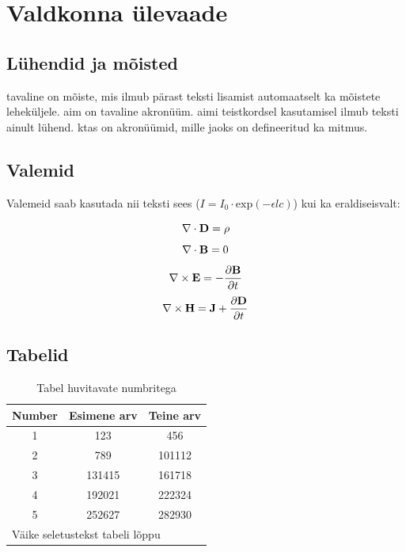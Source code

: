 %
%
%

\section{Valdkonna ülevaade}

\subsection{Lühendid ja mõisted}

\Gls{tavaline} on mõiste, mis ilmub pärast teksti lisamist automaatselt ka mõistete leheküljele.
\Gls{aim} on tavaline akronüüm.
\Gls{aim}i teistkordsel kasutamisel ilmub teksti ainult lühend.
\Glspl{kta} on akronüümid, mille jaoks on defineeritud ka mitmus.

\subsection{Valemid}

Valemeid saab kasutada nii teksti sees ($ I = I_0 \cdot \textrm{exp}(-\epsilon l c)$) kui ka eraldiseisvalt:

\begin{equation}
    \label{gauss}
    \nabla\cdot{\bf D} = \rho
\end{equation}
\begin{equation}
    \label{gaussmagnet}
    \nabla\cdot{\bf B} = 0
\end{equation}
\[
    \nabla\times{\bf E} = - {{\partial{\bf B}}\over{\partial t}}
\]
\[
    \nabla\times{\bf H} = {\bf J} + {{\partial{\bf D}}\over{\partial t}}
\]

\subsection{Tabelid}

\begin{table}[H]
    \caption{\label{tabel}Tabel huvitavate numbritega}
    \centering
    \begin{tabular}{c|c|c}
    Number & Esimene arv & Teine arv \\
    \hline
    1 & 123 & 456 \\
    2 & 789 & 101112 \\
    3 & 131415 & 161718 \\
    4 & 192021 & 222324 \\
    5 & 252627 & 282930 \\
    \hline
    \multicolumn{3}{l}{Väike seletustekst tabeli lõppu}
    \end{tabular}
\end{table}

